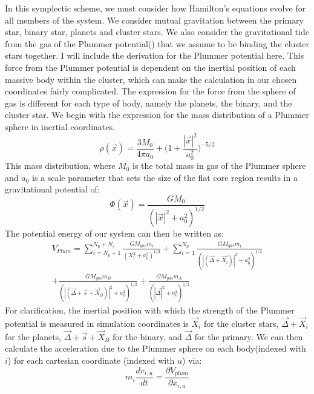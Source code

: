 \documentclass{aastex631}
\begin{document}
In this symplectic scheme, we must consider how Hamilton's equations evolve for all members of the system. We consider mutual gravitation
between the primary star, binary star, planets and cluster stars. We also consider the gravitational tide from the gas of the 
Plummer potential(\cite{plu11}) that we assume to be binding the cluster stars together. I will include the derivation for the Plummer potential here.
This force from the Plummer potential is dependent on the inertial position of each massive body within the cluster, which can make the 
calculation in our chosen coordinates fairly complicated. The expression for the force from the sphere of gas is different for each type of body,
namely the planets, the binary, and the cluster star. We begin with the expression for the mass distribution of a Plummer sphere in inertial coordinates. 
\begin{equation}
\rho (\vec{x}) = \frac{3M_0}{4\pi a_0}+\biggl(1+\frac{|\vec{x}|^2}{a_0^2} \biggr)^{-5/2}
\end{equation}
This mass distribution, where $M_0$ is the total mass in gas of the Plummer sphere and $a_0$ is a scale parameter that sets the size of the flat core region results
in a gravitational potential of:
\begin{equation}
    \Phi(\vec{x}) = \frac{GM_0}{(|\vec{x}|^2+a_0^2)^{1/2}}
\end{equation} 
The potential energy of our system can then be written as:
\begin{equation}
    \begin{split}
        V_{Plum} = \sum_{i=N_p+1}^{N_p+N_s}\frac{GM_{gas}m_i}{(X_i^2+a_0^2)^{1/2}} + 
        \sum_{i=1}^{N_p}\frac{GM_{gas}m_i}{(|(\vec{\Delta}+ \vec{X_i})|^2+a_0^2)^{1/2}} \\ 
        +\frac{GM_{gas}m_B}{(|(\vec{\Delta} + \vec{s} + \vec{X}_B)|^2+a_0^2)^{1/2}} 
        + \frac{GM_{gas}m_A}{(|\vec{\Delta}|^2+a_0^2)^{1/2}} 
    \end{split}
\end{equation}
For clarification, the inertial position with which the strength of the Plummer potential is measured in simulation coordinates is $\vec{X}_i$ for the cluster stars,
$\vec{\Delta}+\vec{X}_i$ for the planets, $\vec{\Delta}+\vec{s}+\vec{X}_B$ for the binary, and $\vec{\Delta}$ for the primary.
We can then calculate the acceleration due to the Plummer sphere on each body(indexed with $i$) for each cartesian coordinate (indexed with $u$) via:
\begin{equation}
    m_i\frac{dv_{i,u}}{dt} = \frac{\partial V_{plum}}{\partial x_{i,u}}
\end{equation}
\end{document}
